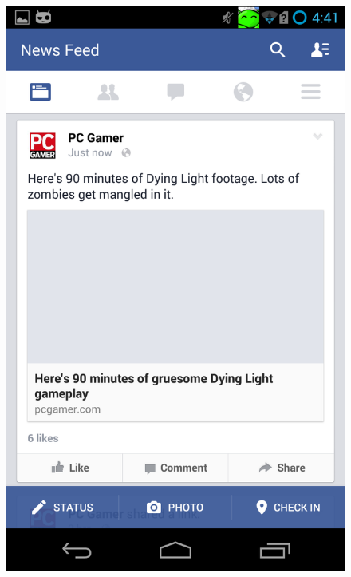 \documentclass[a4paper, 12pt]{article}
\begin{document}
\begin{figure}[!hbt]
\centering
\includegraphics[scale=.3]{imgs/impl/testFacebook}\hspace{2em}

\end{figure}
\end{document}
